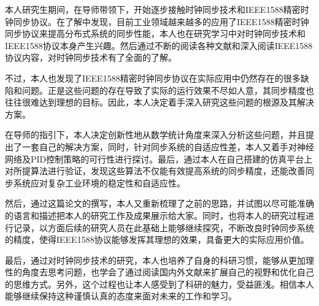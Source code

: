 
\begin{summary}
本人研究生期间，在导师带领下，开始逐步接触时钟同步技术和IEEE1588精密时钟同步协议。在了解中发现，目前工业领域越来越多的应用了IEEE1588精密时钟同步协议来提高分布式系统的同步性能，本人也在研究学习中对时钟同步技术和IEEE1588协议本身产生兴趣。然后通过不断的阅读各种文献和深入阅读IEEE1588协议内容，对时钟同步技术有了全面的了解。

不过，本人也发现了IEEE1588精密时钟同步协议在实际应用中仍然存在的很多缺陷和问题。正是这些问题的存在导致了实际的运行效果不尽如人意，其同步精度也往往很难达到理想的目标。因此，本人决定着手深入研究这些问题的根源及其解决方案。

在导师的指引下，本人决定创新性地从数学统计角度来深入分析这些问题，并且提出了一套自己的解决方案，同时，针对同步系统的自适应性差，本人又着手对神经网络及PID控制策略的可行性进行探讨。最后，通过本人在自己搭建的仿真平台上对所提算法进行验证，发现这些算法不仅能有效提高系统的同步精度，还能改善同步系统应对复杂工业环境的稳定性和自适应性。

然后，通过这篇论文的撰写，本人又重新梳理了之前的思路，并试图以尽可能准确的语言和描述把本人的研究工作及成果展示给大家。同时，也将本人的研究过程进行记录，以方面后续的研究人员在此基础上能够继续探究，不断改良时钟同步系统的精度，使得IEEE1588协议能够发挥其理想的效果，具备更大的实际应用价值。

最后，通过对时钟同步技术的研究，本人也培养了自身的科研习惯，能够从更加理性的角度去思考问题，也学会了通过阅读国内外文献来扩展自己的视野和优化自己的思维方式。另外，这个过程也让本人感受到了科研的魅力，受益匪浅。相信本人能够继续保持这种谨慎认真的态度来面对未来的工作和学习。

\end{summary}
